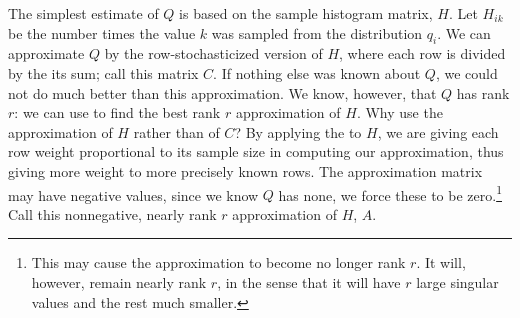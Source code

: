 \documentclass[conference]{IEEEtran}
\begin{document}
The simplest estimate of $Q$ is based on the sample histogram matrix, $H$.
Let $H_{ik}$ be the number times the value $k$ was sampled from the distribution $q_i$.
We can approximate $Q$ by the row-stochasticized version of $H$, where each row is divided by the its sum;
call this matrix $C$.
If nothing else was known about $Q$, we could not do much better than this approximation.
We know, however, that $Q$ has rank $r$:
we can use  to find the best rank $r$ approximation of $H$.
Why use the  approximation of $H$ rather than of $C$?
By applying the  to $H$, we are giving each row weight proportional to its sample size in computing our approximation, thus giving more weight to more precisely known rows.
The  approximation matrix may have negative values, since we know $Q$ has none, we force these to be zero.\footnote{This may cause the approximation to become no longer rank $r$. It will, however, remain nearly rank $r$, in the sense that it will have $r$ large singular values and the rest much smaller.}
Call this nonnegative, nearly rank $r$ approximation of $H$, $A$.




% 
% 
% 
% 


\end{document}
